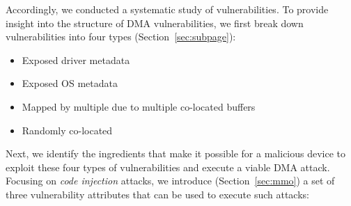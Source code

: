 
Accordingly, we conducted a systematic study of \subpage{} vulnerabilities. To provide  insight into the structure of DMA vulnerabilities, we first break down \subpage{} vulnerabilities into four types (Section~\ref{sec:subpage}):
\begin{itemize}
    \item Exposed driver metadata
    \item Exposed OS metadata 
    \item Mapped by multiple \iova due to multiple co-located buffers
    \item Randomly co-located
\end{itemize}


Next, we identify the ingredients that make it possible for a malicious device to exploit these four types of \subpage{} vulnerabilities and execute a viable DMA attack.
Focusing on \emph{code injection} attacks, we introduce (Section~\ref{sec:mmo}) a set of three vulnerability attributes that can be used to execute such attacks:

